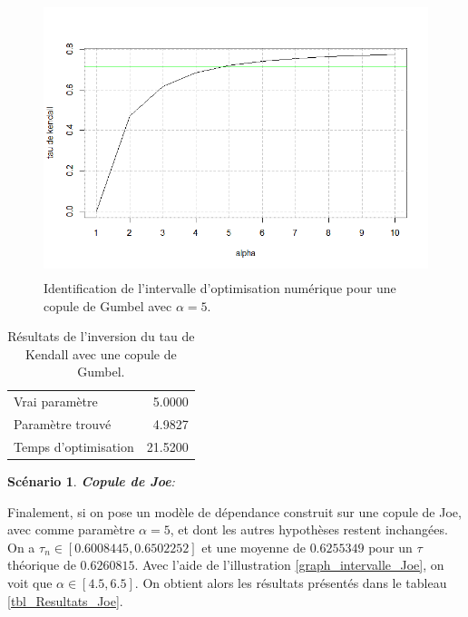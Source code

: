 \documentclass{article}
\newtheorem{scenario}{Scénario}
\begin{document}
	\begin{figure}[H]
		\centering
		\includegraphics[height=8cm]{Graph/intevalle_Gumbel.png}
		\caption[Identification de l'intervalle d'optimisation numérique pour le scénario \ref{scenario_Gumbel}]
		{Identification de l'intervalle d'optimisation numérique pour une copule de Gumbel avec $\alpha = 5$.} 
		\label{graph_intervalle_Gumbel}
	\end{figure}
	
	\begin{table}[H]
		\centering
		\begin{tabular}{lr}
			\hline
			Vrai paramètre & 5.0000 \\ 
			Paramètre trouvé & 4.9827 \\ 
			Temps d'optimisation & 21.5200 \\ 
			\hline 
		\end{tabular}
		\caption{Résultats de l'inversion du tau de Kendall avec une copule de Gumbel.}
		\label{tbl_Resultats_Gumbel}
	\end{table}


	\begin{scenario}
		\textbf{Copule de Joe}:
		\label{scenario_Joe}
	\end{scenario}
	Finalement, si on pose un modèle de dépendance construit sur une copule de Joe, avec comme paramètre $\alpha = 5$, et dont les autres hypothèses restent inchangées. On a $\tau_n \in [0.6008445, 0.6502252]$ et une moyenne de $0.6255349$ pour un $\tau$ théorique de $0.6260815$. Avec l'aide de l'illustration \ref{graph_intervalle_Joe}, on voit que $\alpha \in [4.5, 6.5]$. On obtient alors les résultats présentés dans le tableau \ref{tbl_Resultats_Joe}.
	
\end{document}
